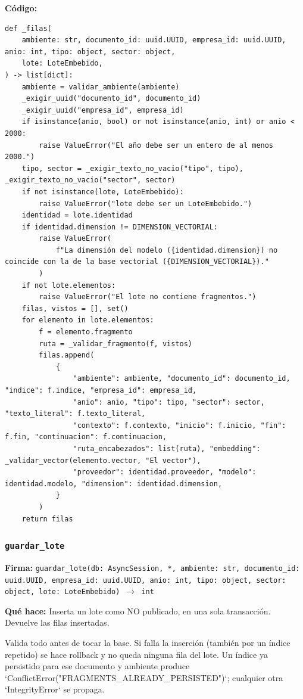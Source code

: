 \documentclass[11pt,a4paper]{article}
\begin{document}
\textbf{Código:}
\begin{lstlisting}
def _filas(
    ambiente: str, documento_id: uuid.UUID, empresa_id: uuid.UUID, anio: int, tipo: object, sector: object,
    lote: LoteEmbebido,
) -> list[dict]:
    ambiente = validar_ambiente(ambiente)
    _exigir_uuid("documento_id", documento_id)
    _exigir_uuid("empresa_id", empresa_id)
    if isinstance(anio, bool) or not isinstance(anio, int) or anio < 2000:
        raise ValueError("El año debe ser un entero de al menos 2000.")
    tipo, sector = _exigir_texto_no_vacio("tipo", tipo), _exigir_texto_no_vacio("sector", sector)
    if not isinstance(lote, LoteEmbebido):
        raise ValueError("lote debe ser un LoteEmbebido.")
    identidad = lote.identidad
    if identidad.dimension != DIMENSION_VECTORIAL:
        raise ValueError(
            f"La dimensión del modelo ({identidad.dimension}) no coincide con la de la base vectorial ({DIMENSION_VECTORIAL})."
        )
    if not lote.elementos:
        raise ValueError("El lote no contiene fragmentos.")
    filas, vistos = [], set()
    for elemento in lote.elementos:
        f = elemento.fragmento
        ruta = _validar_fragmento(f, vistos)
        filas.append(
            {
                "ambiente": ambiente, "documento_id": documento_id, "indice": f.indice, "empresa_id": empresa_id,
                "anio": anio, "tipo": tipo, "sector": sector, "texto_literal": f.texto_literal,
                "contexto": f.contexto, "inicio": f.inicio, "fin": f.fin, "continuacion": f.continuacion,
                "ruta_encabezados": list(ruta), "embedding": _validar_vector(elemento.vector, "El vector"),
                "proveedor": identidad.proveedor, "modelo": identidad.modelo, "dimension": identidad.dimension,
            }
        )
    return filas
\end{lstlisting}

\subsubsection*{\texttt{guardar\_lote}}
\textbf{Firma:} \texttt{guardar\_lote(db: AsyncSession, *, ambiente: str, documento\_id: uuid.UUID, empresa\_id: uuid.UUID, anio: int, tipo: object, sector: object, lote: LoteEmbebido) $\rightarrow$ int}

\textbf{Qué hace:} Inserta un lote como NO publicado, en una sola transacción. Devuelve las filas insertadas.

Valida todo antes de tocar la base. Si falla la inserción (también por un índice repetido) se hace
rollback y no queda ninguna fila del lote. Un índice ya persistido para ese documento y ambiente
produce `ConflictError("FRAGMENTS\_ALREADY\_PERSISTED")`; cualquier otra `IntegrityError` se propaga.
\end{document}
